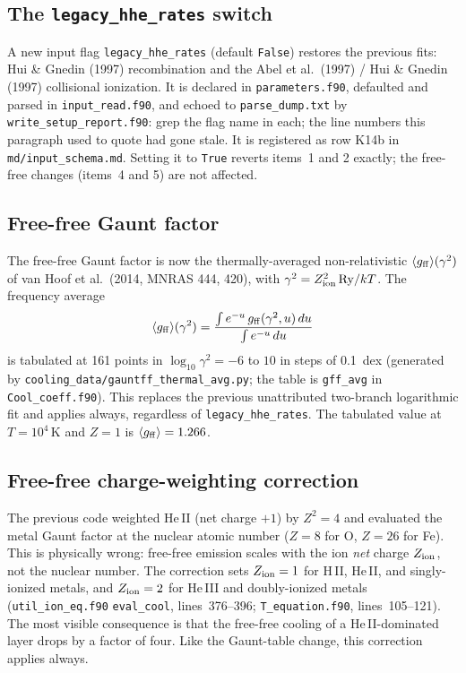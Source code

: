 \documentclass[english,a4paper]{my_memo}
\newcommand{\bk}{\discretionary{}{}{}}
\newcommand{\code}[1]{\texttt{#1}}
\begin{document}
\subsection{The \code{legacy\_hhe\_rates} switch}
A new input flag \code{legacy\_hhe\_rates} (default \code{False}) restores
the previous fits: Hui \& Gnedin (1997) recombination and the
Abel et al.\ (1997) / Hui \& Gnedin (1997) collisional ionization. It is
declared in \code{parameters.f90}, defaulted and parsed in
\code{input\_read.f90}, and echoed to \code{parse\_dump.txt} by
\code{write\_setup\_report.f90}: grep the flag name in each; the line numbers
this paragraph used to quote had gone stale. It
is registered as row K14b in \code{md/input\_schema.md}. Setting it to
\code{True} reverts items~1 and 2 exactly; the free-free changes (items~4
and 5) are not affected.

\subsection{Free-free Gaunt factor}\label{sec:gaunt}
The free-free Gaunt factor is now the thermally-averaged non-relativistic
$\langle g_{\rm ff}\rangle(\gamma^2)$ of van Hoof et al.\ (2014, MNRAS
444, 420), with $\gamma^2 = Z_{\rm ion}^2\,\mathrm{Ry}/kT$. The frequency
average
\begin{equation}
\langle g_{\rm ff}\rangle(\gamma^2)
  = \frac{\int e^{-u}\,g_{\rm ff}(\gamma^2,u)\,du}{\int e^{-u}\,du}
\end{equation}
is tabulated at 161 points in $\log_{10}\gamma^2 = -6$ to $10$ in steps of
0.1~dex (generated by \code{cooling\_data/\bk gauntff\_\bk thermal\_\bk avg.py}; the
table is \code{gff\_avg} in \code{Cool\_coeff.f90}). This
replaces the previous unattributed two-branch logarithmic fit and applies
always, regardless of \code{legacy\_hhe\_rates}. The tabulated value at
$T=10^4$\,K and $Z=1$ is $\langle g_{\rm ff}\rangle = 1.266$.

\subsection{Free-free charge-weighting correction}
The previous code weighted He\,II (net charge $+1$) by $Z^2=4$ and
evaluated the metal Gaunt factor at the nuclear atomic number ($Z=8$ for
O, $Z=26$ for Fe). This is physically wrong: free-free emission scales
with the ion \emph{net} charge $Z_{\rm ion}$, not the nuclear number. The
correction sets $Z_{\rm ion}=1$ for H\,II, He\,II, and singly-ionized
metals, and $Z_{\rm ion}=2$ for He\,III and doubly-ionized metals
(\code{util\_ion\_eq.f90} \code{eval\_cool}, lines~376--396;
\code{T\_equation.f90}, lines~105--121). The most visible consequence is
that the free-free cooling of a He\,II-dominated layer drops by a factor
of four. Like the Gaunt-table change, this correction applies always.
\end{document}
